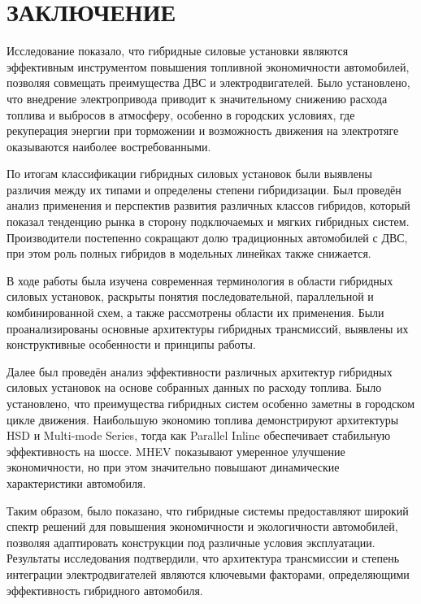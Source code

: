 \chapter*{ЗАКЛЮЧЕНИЕ}

Исследование показало, что гибридные силовые установки являются эффективным инструментом повышения топливной экономичности автомобилей, позволяя совмещать преимущества ДВС и электродвигателей. Было установлено, что внедрение электропривода приводит к значительному снижению расхода топлива и выбросов в атмосферу, особенно в городских условиях, где рекуперация энергии при торможении и возможность движения на электротяге оказываются наиболее востребованными.

По итогам классификации гибридных силовых установок были выявлены различия между их типами и определены степени гибридизации. Был проведён анализ применения и перспектив развития различных классов гибридов, который показал тенденцию рынка в сторону подключаемых и мягких гибридных систем. Производители постепенно сокращают долю традиционных автомобилей с ДВС, при этом роль полных гибридов в модельных линейках также снижается.

В ходе работы была изучена современная терминология в области гибридных силовых установок, раскрыты понятия последовательной, параллельной и комбинированной схем, а также рассмотрены области их применения. Были проанализированы основные архитектуры гибридных трансмиссий, выявлены их конструктивные особенности и принципы работы.

Далее был проведён анализ эффективности различных архитектур гибридных силовых установок на основе собранных данных по расходу топлива. Было установлено, что преимущества гибридных систем особенно заметны в городском цикле движения. Наибольшую экономию топлива демонстрируют архитектуры HSD и Multi-mode Series, тогда как Parallel Inline обеспечивает стабильную эффективность на шоссе. MHEV показывают умеренное улучшение экономичности, но при этом значительно повышают динамические характеристики автомобиля.

Таким образом, было показано, что гибридные системы предоставляют широкий спектр решений для повышения экономичности и экологичности автомобилей, позволяя адаптировать конструкции под различные условия эксплуатации. Результаты исследования подтвердили, что архитектура трансмиссии и степень интеграции электродвигателей являются ключевыми факторами, определяющими эффективность гибридного автомобиля.

